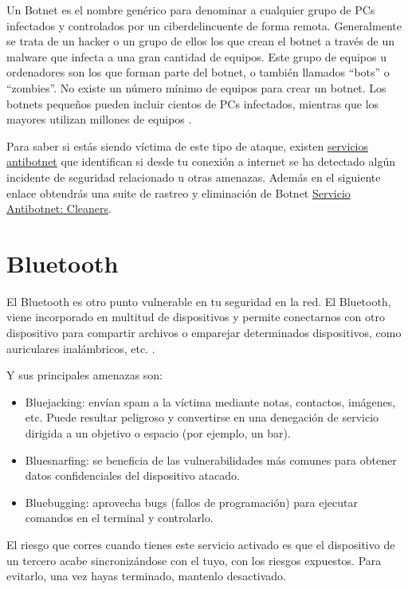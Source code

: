 \documentclass[
  a4paper,
  openany]{book}
\begin{document}
Un Botnet es el nombre genérico para denominar a cualquier grupo de PCs infectados y controlados por un ciberdelincuente de forma remota. Generalmente se trata de un hacker o un grupo de ellos los que crean el botnet a través de un malware que infecta a una gran cantidad de equipos. Este grupo de equipos u ordenadores son los que forman parte del botnet, o también llamados ``bots'' o ``zombies''. No existe un número mínimo de equipos para crear un botnet. Los botnets pequeños pueden incluir cientos de PCs infectados, mientras que los mayores utilizan millones de equipos \citep{INCI-botnet}.

Para saber si estás siendo víctima de este tipo de ataque, existen \href{https://www.incibe.es/ciudadania/herramientas/servicio-antibotnet/}{servicios antibotnet} que identifican si desde tu conexión a internet se ha detectado algún incidente de seguridad relacionado u otras amenazas. Además en el siguiente enlace obtendrás una suite de rastreo y eliminación de Botnet \href{https://www.incibe.es/ciudadania/servicio-antibotnet/cleaners}{Servicio Antibotnet: Cleaners}.

\hypertarget{bluetooth}{%
\section{Bluetooth}\label{bluetooth}}

El Bluetooth es otro punto vulnerable en tu seguridad en la red. El Bluetooth, viene incorporado en multitud de dispositivos y permite conectarnos con otro dispositivo para compartir archivos o emparejar determinados dispositivos, como auriculares inalámbricos, etc. \citep{IONOS-bluetooh}.

Y sus principales amenazas son:

\begin{itemize}
\item
  Bluejacking: envían spam a la víctima mediante notas, contactos, imágenes, etc. Puede resultar peligroso y convertirse en una denegación de servicio dirigida a un objetivo o espacio (por ejemplo, un bar).
\item
  Bluesnarfing: se beneficia de las vulnerabilidades más comunes para obtener datos confidenciales del dispositivo atacado.
\item
  Bluebugging: aprovecha bugs (fallos de programación) para ejecutar comandos en el terminal y controlarlo.
\end{itemize}

El riesgo que corres cuando tienes este servicio activado es que el dispositivo de un tercero acabe sincronizándose con el tuyo, con los riesgos expuestos. Para evitarlo, una vez hayas terminado, mantenlo desactivado.
\end{document}
